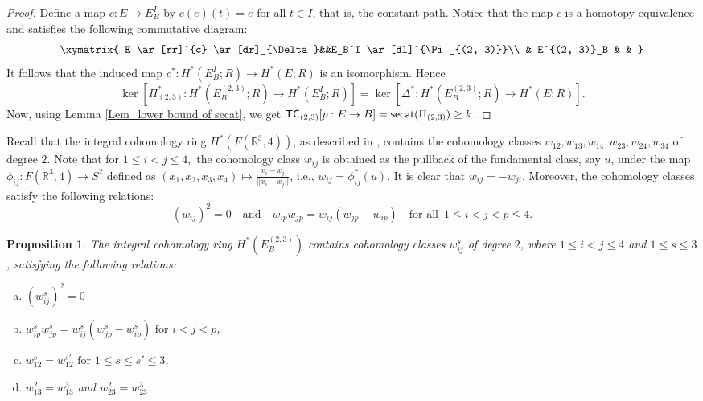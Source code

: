 \documentclass[12pt,oneside,reqno]{amsart}
\theoremstyle{plain}
\newtheorem{proposition}[theorem]{Proposition}
\theoremstyle{definition}
\theoremstyle{remark}
\newcommand{\secat}{{\sf {secat}}}
\newcommand{\TC}{{\sf {TC}}}
\newcommand{\rr}{{\mathbb {R}}}
\begin{document}
\begin{proof}
Define a map $c : E \to E_B^I$ by $c(e)(t) = e$ for all $t\in I$, that is, the constant path. Notice that the map $c$ is a homotopy equivalence and satisfies the following commutative diagram: 
$$
\xymatrix{
	E \ar[rr]^{c} \ar[dr]_{\Delta}&&E_B^I \ar[dl]^{\Pi_{(2, 3)}}\\
	& E^{(2, 3)}_B & &
}
$$
It follows that the induced map $c^*\colon H^*(E^I_B;R)\to H^*(E;R)$ is an isomorphism. Hence $$\ker[\Pi_{(2, 3)}^*: H^\ast(E^{(2, 3)}_B;R) \to H^*(E_B^I; R)] = \ker[\Delta^*: H^\ast(E^{(2, 3)}_B;R) \to H^*(E; R)].$$ Now, using Lemma \ref{Lem_lower bound of secat}, we get $\TC_{(2, 3)}[p: E \to B]=\secat(\Pi_{(2, 3)})\geq k$. 
\end{proof}
 
Recall that the integral cohomology ring $H^\ast(F(\rr^3, 4))$, as described in \cite[Theorem V.4.2]{FadH01}, contains the cohomology classes $w_{12}, w_{13}, w_{14}, w_{23}, w_{24}, w_{34}$ of degree $2$. Note that for $1\leq i< j\leq 4,$ the cohomology class $w_{ij}$ is obtained as the pullback of the fundamental class, say $u$, under the map $\phi_{ij}\colon F(\rr^3,4)\to S^2$ defined as $(x_1,x_2,x_3,x_4)\mapsto \frac{x_i-x_j}{||x_i-x_j||}$, i.e., $w_{ij} = \phi_{ij}^*(u)$. It is clear that $w_{ij} = - w_{ji}$. Moreover, the cohomology classes satisfy the following relations: 
 \begin{equation}\label{Eq_relations in example}
 (w_{ij})^2=0 \quad \mbox{and}\quad w_{ip}w_{jp}= w_{ij}(w_{jp}-w_{ip})\quad \text{for all }\,  1\leq i<j<p\leq 4.
 \end{equation}
 


\begin{proposition}\label{Prop_cohom ring E23}
The integral cohomology ring $H^*(E_B^{(2,3)})$ contains cohomology classes $w^s_{ij}$ of degree $2$, where $1\leq i < j \leq 4$ and $1\leq s \leq 3$, satisfying the following relations:
\begin{enumerate}[(a)]
\item $(w^s_{ij})^2=0$
\item $w^s_{ip} w^s_{jp}= w^s_{ij} (w^s_{jp} - w^s_{ip}) \text{ for } i<j<p$,
\item $w^s_{12} = w^{s'}_{12} \text{ for } 1\leq s \leq s' \leq 3$,
\item $w^2_{13}=w^3_{13}$ and $w^2_{23}=w^3_{23}$.
\end{enumerate}
\end{proposition}
\end{document}
